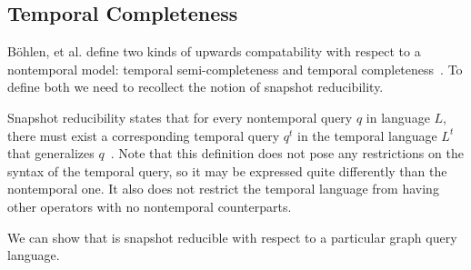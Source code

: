 \subsection{Temporal Completeness}
\label{sec:formal:reducible}

B{\"{o}}hlen, et al. define two kinds of upwards
  compatability with respect to a nontemporal model: temporal
  semi-completeness and temporal completeness~\cite{Bohlen1995}.  To
  define both we need to recollect the notion of snapshot reducibility.

Snapshot reducibility states that for every nontemporal query $q$ in
language $L$, there must exist a corresponding temporal query $q^t$ in
the temporal language $L^t$ that generalizes $q$~\cite{Dignos2012}.
Note that this definition does not pose any restrictions on the syntax
of the temporal query, so it may be expressed quite differently than
the nontemporal one.  It also does not restrict the temporal language
from having other operators with no nontemporal counterparts.

We can show that \tga is snapshot reducible with respect to
  a particular graph query language.

%

